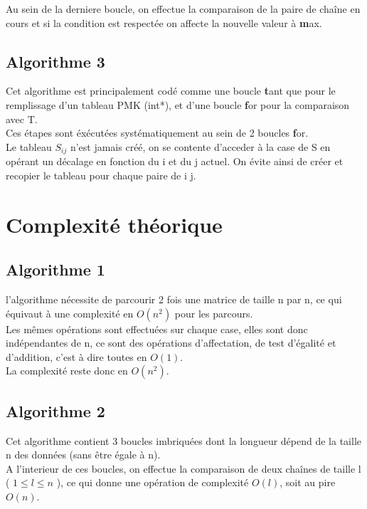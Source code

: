  Au sein de la derniere boucle, on effectue la comparaison de la paire de chaîne en cours et si la condition est respectée on affecte la nouvelle valeur à {\textbf max}.
 
  \subsection{Algorithme 3}
	
	Cet algorithme est principalement codé comme une boucle {\textbf tant que} pour le remplissage d'un tableau PMK (int*), et d'une boucle {\textbf for} pour la comparaison avec T.\\
	
	Ces étapes sont éxécutées systématiquement au sein de 2 boucles {\textbf for}.\\
	
	Le tableau $S_{ij}$ n'est jamais créé, on se contente d'acceder à la case de S en opérant un décalage en fonction du i et du j actuel. On évite ainsi de créer et recopier le tableau pour chaque paire de i j.
	
\section{Complexité théorique}
  \label{c_theorique}
  \subsection{Algorithme 1}
  l'algorithme nécessite de parcourir 2 fois une matrice de taille n par n, ce qui équivaut à une complexité en $O(n^2)$ pour les parcours.\\

  Les mêmes opérations sont effectuées sur chaque case, elles sont donc indépendantes de n, ce sont des opérations d'affectation, de test d'égalité et d'addition, c'est à dire toutes en $O(1)$.\\

  La complexité reste donc en $O(n^2)$.
  
  \subsection{Algorithme 2}
	Cet algorithme contient 3 boucles imbriquées dont la longueur dépend de la taille n des données (sans être égale à n).\\
	
	A l'interieur de ces boucles, on effectue la comparaison de deux chaînes de taille l ( $1 \leq l \leq n$ ), ce qui donne une opération de complexité $O(l)$, soit au pire $O(n)$.\\
	
